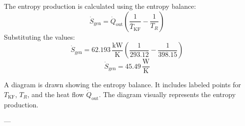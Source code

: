 The entropy production is calculated using the entropy balance:  
\[
\dot{S}_{\text{gen}} = \dot{Q}_{\text{out}} \left( \frac{1}{\bar{T}_{\text{KF}}} - \frac{1}{T_R} \right)
\]  
Substituting the values:  
\[
\dot{S}_{\text{gen}} = 62.193 \, \frac{\text{kW}}{\text{K}} \left( \frac{1}{293.12} - \frac{1}{398.15} \right)
\]  
\[
\dot{S}_{\text{gen}} = 45.49 \, \frac{\text{W}}{\text{K}}
\]  

A diagram is drawn showing the entropy balance. It includes labeled points for \( T_{\text{KF}} \), \( T_R \), and the heat flow \( \dot{Q}_{\text{out}} \). The diagram visually represents the entropy production.

---